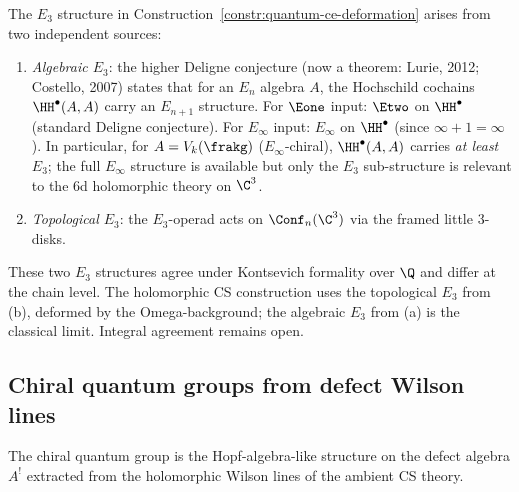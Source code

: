\begin{remark}
\label{rem:two-e3-ap154}
The $E_3$ structure in Construction~\ref{constr:quantum-ce-deformation} arises from two independent sources:
\begin{enumerate}[label=\textup{(\alph*)}]
 \item \emph{Algebraic $E_3$}: the higher Deligne conjecture (now a theorem: Lurie, 2012; Costello, 2007) states that for an $E_n$ algebra $A$, the Hochschild cochains $\HH^\bullet(A, A)$ carry an $E_{n+1}$ structure. For $\Eone$ input: $\Etwo$ on $\HH^\bullet$ (standard Deligne conjecture). For $E_\infty$ input: $E_\infty$ on $\HH^\bullet$ (since $\infty + 1 = \infty$). In particular, for $A = V_k(\frakg)$ ($E_\infty$-chiral), $\HH^\bullet(A,A)$ carries \emph{at least} $E_3$; the full $E_\infty$ structure is available but only the $E_3$ sub-structure is relevant to the 6d holomorphic theory on $\C^3$.
 \item \emph{Topological $E_3$}: the $E_3$-operad acts on $\Conf_n(\C^3)$ via the framed little $3$-disks.
\end{enumerate}
These two $E_3$ structures agree under Kontsevich formality over $\Q$ and differ at the chain level. The holomorphic CS construction uses the topological $E_3$ from (b), deformed by the Omega-background; the algebraic $E_3$ from (a) is the classical limit. Integral agreement remains open.
\end{remark}

\subsection{Chiral quantum groups from defect Wilson lines}
\label{subsec:chiral-qg-wilson}

The chiral quantum group is the Hopf-algebra-like structure on the defect algebra $A^!$ extracted from the holomorphic Wilson lines of the ambient CS theory.

